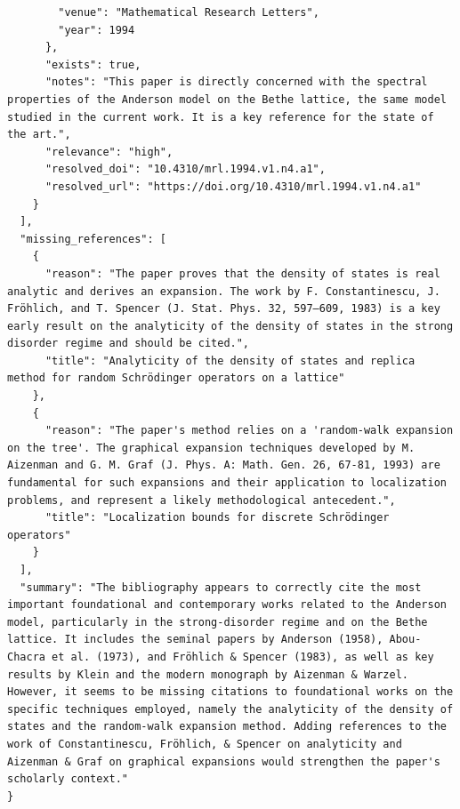 \documentclass[11pt]{article}
\begin{document}
\begin{verbatim}
        "venue": "Mathematical Research Letters",
        "year": 1994
      },
      "exists": true,
      "notes": "This paper is directly concerned with the spectral properties of the Anderson model on the Bethe lattice, the same model studied in the current work. It is a key reference for the state of the art.",
      "relevance": "high",
      "resolved_doi": "10.4310/mrl.1994.v1.n4.a1",
      "resolved_url": "https://doi.org/10.4310/mrl.1994.v1.n4.a1"
    }
  ],
  "missing_references": [
    {
      "reason": "The paper proves that the density of states is real analytic and derives an expansion. The work by F. Constantinescu, J. Fröhlich, and T. Spencer (J. Stat. Phys. 32, 597–609, 1983) is a key early result on the analyticity of the density of states in the strong disorder regime and should be cited.",
      "title": "Analyticity of the density of states and replica method for random Schrödinger operators on a lattice"
    },
    {
      "reason": "The paper's method relies on a 'random-walk expansion on the tree'. The graphical expansion techniques developed by M. Aizenman and G. M. Graf (J. Phys. A: Math. Gen. 26, 67-81, 1993) are fundamental for such expansions and their application to localization problems, and represent a likely methodological antecedent.",
      "title": "Localization bounds for discrete Schrödinger operators"
    }
  ],
  "summary": "The bibliography appears to correctly cite the most important foundational and contemporary works related to the Anderson model, particularly in the strong-disorder regime and on the Bethe lattice. It includes the seminal papers by Anderson (1958), Abou-Chacra et al. (1973), and Fröhlich & Spencer (1983), as well as key results by Klein and the modern monograph by Aizenman & Warzel. However, it seems to be missing citations to foundational works on the specific techniques employed, namely the analyticity of the density of states and the random-walk expansion method. Adding references to the work of Constantinescu, Fröhlich, & Spencer on analyticity and Aizenman & Graf on graphical expansions would strengthen the paper's scholarly context."
}
\end{verbatim}
\end{document}
